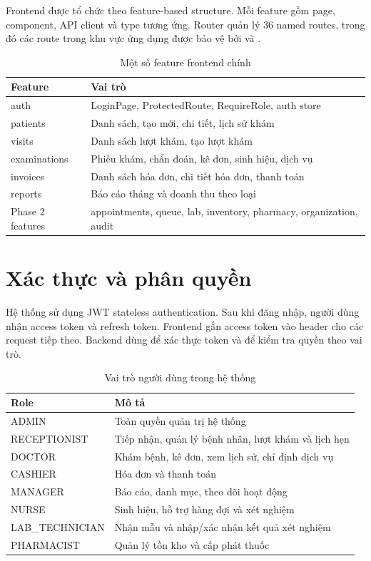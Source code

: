 Frontend được tổ chức theo feature-based structure. Mỗi feature gồm page, component, API client và type tương ứng. Router quản lý 36 named routes, trong đó các route trong khu vực ứng dụng được bảo vệ bởi  và .

\begin{table}[H]
\centering
\caption{Một số feature frontend chính}
\begin{tabularx}{\textwidth}{|p{4cm}|X|}
\hline
\textbf{Feature} & \textbf{Vai trò} \\
\hline
auth & LoginPage, ProtectedRoute, RequireRole, auth store \\
\hline
patients & Danh sách, tạo mới, chi tiết, lịch sử khám \\
\hline
visits & Danh sách lượt khám, tạo lượt khám \\
\hline
examinations & Phiếu khám, chẩn đoán, kê đơn, sinh hiệu, dịch vụ \\
\hline
invoices & Danh sách hóa đơn, chi tiết hóa đơn, thanh toán \\
\hline
reports & Báo cáo tháng và doanh thu theo loại \\
\hline
Phase 2 features & appointments, queue, lab, inventory, pharmacy, organization, audit \\
\hline
\end{tabularx}
\end{table}

\section{Xác thực và phân quyền}

Hệ thống sử dụng JWT stateless authentication. Sau khi đăng nhập, người dùng nhận access token và refresh token. Frontend gắn access token vào header  cho các request tiếp theo. Backend dùng  để xác thực token và  để kiểm tra quyền theo vai trò.

\begin{table}[H]
\centering
\caption{Vai trò người dùng trong hệ thống}
\begin{tabularx}{\textwidth}{|p{4cm}|X|}
\hline
\textbf{Role} & \textbf{Mô tả} \\
\hline
ADMIN & Toàn quyền quản trị hệ thống \\
\hline
RECEPTIONIST & Tiếp nhận, quản lý bệnh nhân, lượt khám và lịch hẹn \\
\hline
DOCTOR & Khám bệnh, kê đơn, xem lịch sử, chỉ định dịch vụ \\
\hline
CASHIER & Hóa đơn và thanh toán \\
\hline
MANAGER & Báo cáo, danh mục, theo dõi hoạt động \\
\hline
NURSE & Sinh hiệu, hỗ trợ hàng đợi và xét nghiệm \\
\hline
LAB\_TECHNICIAN & Nhận mẫu và nhập/xác nhận kết quả xét nghiệm \\
\hline
PHARMACIST & Quản lý tồn kho và cấp phát thuốc \\
\hline
\end{tabularx}
\end{table}

